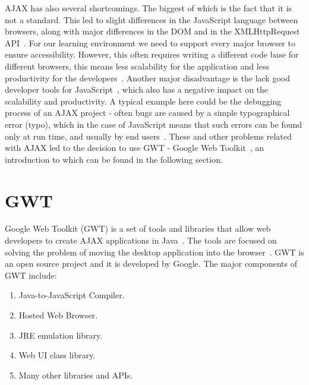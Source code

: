 AJAX has also several shortcomings. 
The biggest of which is the fact that it is not a standard. This led to slight 
differences in the JavaScript language between browsers, along with major differences 
in the DOM and in the XMLHttpRequest API~\cite{bgwt1, bgwt2, bgwt3}. 
For our learning environment we need to support every major browser to ensure accessibility. 
However, this often requires writing a different code base for different browsers,
this means less scalability for the application and less productivity 
for the developers~\cite{bgwt2}. Another major
disadvantage is the lack good developer tools for JavaScript~\cite{bgwt2}, which also 
has a negative impact on the scalability and productivity.
A typical example here could be the debugging process of an AJAX project - 
often bugs are caused by a simple typographical error (typo), which in the case 
of JavaScript means that such errors can be found only at run time, and usually 
by end users~\cite{wgdd1}. 
These and other problems related with AJAX
led to the decision to use GWT - Google Web Toolkit~\cite{wgwt}, an introduction 
to which can be found in the following section.

\section{GWT} 
\label{sec:gwt}
Google Web Toolkit (GWT) is a set of tools and libraries that allow
web developers to create AJAX applications in Java~\cite{wgwt}. 
The tools are focused on solving the problem of moving the desktop application into the
browser~\cite{bgwt2}. GWT is an open source project and it is developed 
by Google. The major components of GWT include: 

\begin{enumerate}
	\item Java-to-JavaScript Compiler.
	\item Hosted Web Browser.
	\item JRE emulation library.
	\item Web UI class library.
	\item Many other libraries and APIs.
\end{enumerate}

